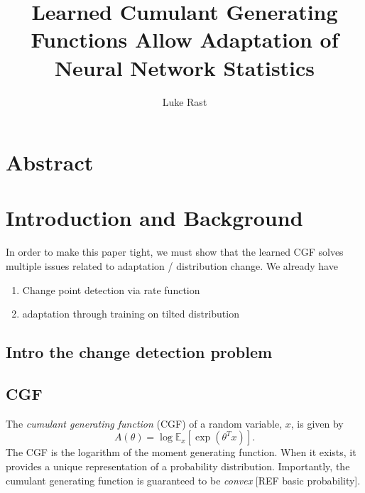 \documentclass[10pt]{article}      %
\begin{document}
\title{Learned Cumulant Generating Functions Allow Adaptation of Neural Network Statistics}
\author{Luke Rast}
\maketitle

\doublespacing
\linenumbers


\section{Abstract}






\section{Introduction and Background}



In order to make this paper tight, we must show that the learned CGF solves multiple issues related to adaptation / distribution change.
We already have
\begin{enumerate}
  \item Change point detection via rate function
  \item adaptation through training on tilted distribution
\end{enumerate}


\subsection{Intro the change detection problem}






\subsection{CGF}

The \textit{cumulant generating function} (CGF) of a random variable, $x$, is given by
\begin{equation}
  A(\theta) = \log \mathbb{E}_x[\exp(\theta^T x)]. \label{def:cgf}
\end{equation}
The CGF is the logarithm of the moment generating function.
When it exists, it provides a unique representation of a probability distribution.
Importantly, the cumulant generating function is guaranteed to be \textit{convex} [REF basic probability].
\end{document}
